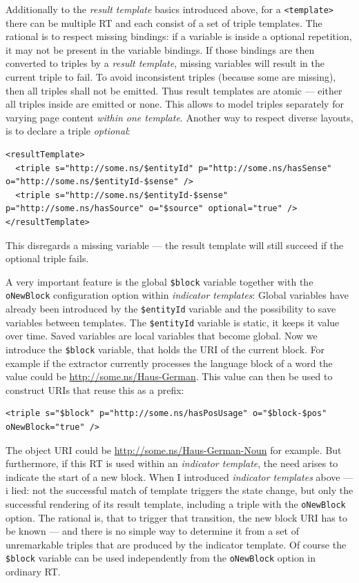 Additionally to the \textit{result template} basics introduced above, for a \texttt{<template>} there can be multiple RT and each consist of a set of triple templates. 
The rational is to respect missing bindings: if a variable is inside a optional repetition, it may not be present in the variable bindings. 
If those bindings are then converted to triples by a \textit{result template}, missing variables will result in the current triple to fail. 
To avoid inconsistent triples (because some are missing), then all triples shall not be emitted. 
Thus result templates are atomic --- either all triples inside are emitted or none. 
This allows to model triples separately for varying page content \textit{within one template}.
Another way to respect diverse layouts, is to declare a triple \textit{optional}:
\begin{lstlisting}[style=XML]
<resultTemplate>
  <triple s="http://some.ns/$entityId" p="http://some.ns/hasSense" o="http://some.ns/$entityId-$sense" />
  <triple s="http://some.ns/$entityId-$sense" p="http://some.ns/hasSource" o="$source" optional="true" />
</resultTemplate>
\end{lstlisting}
This disregards a missing variable --- the result template will still succeed if the optional triple fails.

A very important feature is the global \texttt{\$block} variable together with the \texttt{oNewBlock} configuration option within \textit{indicator templates}:
Global variables have already been introduced by the \texttt{\$entityId} variable and the possibility to save variables between templates. 
The \texttt{\$entityId} variable is static, it keeps it value over time. 
Saved variables are local variables that become global. 
Now we introduce the \texttt{\$block} variable, that holds the URI of the current block. 
For example if the extractor currently processes the language block of a word the value could be \url{http://some.ns/Haus-German}. 
This value can then be used to construct URIs that reuse this as a prefix:
\begin{lstlisting}[style=XML]
<triple s="$block" p="http://some.ns/hasPosUsage" o="$block-$pos" oNewBlock="true" />
\end{lstlisting}
The object URI could be \url{http://some.ns/Haus-German-Noun} for example. 
But furthermore, if this RT is used within an \textit{indicator template}, the need arises to indicate the start of a new block. 
When I introduced \textit{indicator templates} above --- i lied: not the successful match of template triggers the state change, but only the successful rendering of its result template, including a triple with the \texttt{oNewBlock} option.
The rational is, that to trigger that transition, the new block URI has to be known --- and there is no simple way to determine it from a set of unremarkable triples that are produced by the indicator template.
Of course the \texttt{\$block} variable can be used independently from the \texttt{oNewBlock} option in ordinary RT.

